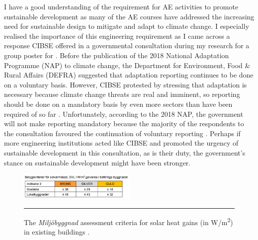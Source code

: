 I have a good understanding of the requirement for AE activities to promote sustainable development as many of the AE courses have addressed the increasing need for sustainable design to mitigate and adapt to climate change.
I especially realised the importance of this engineering requirement as I came across a response CIBSE offered in a governmental consultation during my research for a group poster for \CCSATitle.
Before the publication of the 2018 National Adaptation Programme (NAP) to climate change, 
the Department for Environment, Food \& Rural Affairs (DEFRA) suggested that adaptation reporting continues to be done on a voluntary basis.
However, CIBSE protested by stressing that adaptation is necessary because climate change threats are real and imminent, so reporting should be done on a mandatory basis by even more sectors than have been required of so far \citep{CIBSE:CCAreporting}.
Unfortunately, according to the 2018 NAP, the government will not make reporting mandatory because the majority of the respondents to the consultation favoured the continuation of voluntary reporting \citep{DEFRA2018}.
Perhaps if more engineering institutions acted like CIBSE and promoted the urgency of sustainable development in this consultation, as is their duty, the government's stance on sustainable development might have been stronger.

\begin{figure}
	\centering
	\includegraphics[width=0.5\textwidth]{figures/SVL.PNG}
	\rule{0.5\textwidth}{0.5pt} %
	\caption[The \textit{Miljöbyggnad} assessment criteria for solar heat gains in existing buildings.]{The \textit{Miljöbyggnad} assessment criteria for solar heat gains (in W/m\textsuperscript{2}) in existing buildings \citep{SwedenGreenBuildingCouncil2017}.}
	\label{fig:svl}
\end{figure}

